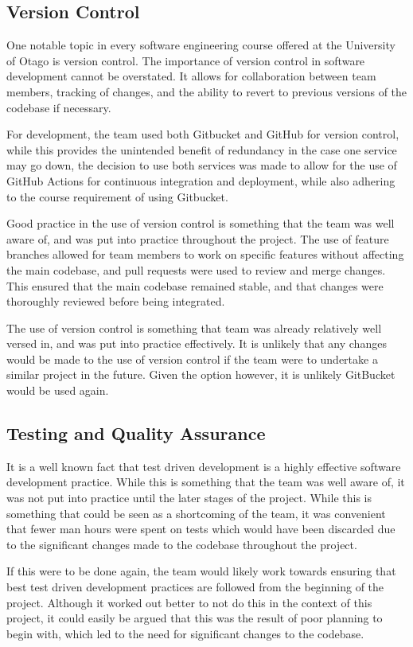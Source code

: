 \documentclass[conference]{IEEEtran}
\begin{document}
\subsection{Version Control}
One notable topic in every software engineering course offered at the University of Otago is version control. The importance of version control in software development cannot be overstated. It allows for collaboration between team members, tracking of changes, and the ability to revert to previous versions of the codebase if necessary.

For development, the team used both Gitbucket and GitHub for version control, while this provides the unintended benefit of redundancy in the case one service may go down, the decision to use both services was made to allow for the use of GitHub Actions for continuous integration and deployment, while also adhering to the course requirement of using Gitbucket.

Good practice in the use of version control is something that the team was well aware of, and was put into practice throughout the project. The use of feature branches allowed for team members to work on specific features without affecting the main codebase, and pull requests were used to review and merge changes. This ensured that the main codebase remained stable, and that changes were thoroughly reviewed before being integrated.

The use of version control is something that team was already relatively well versed in, and was put into practice effectively. It is unlikely that any changes would be made to the use of version control if the team were to undertake a similar project in the future. Given the option however, it is unlikely GitBucket would be used again.

\subsection{Testing and Quality Assurance}
It is a well known fact that test driven development is a highly effective software development practice. While this is something that the team was well aware of, it was not put into practice until the later stages of the project. While this is something that could be seen as a shortcoming of the team, it was convenient that fewer man hours were spent on tests which would have been discarded due to the significant changes made to the codebase throughout the project. 

If this were to be done again, the team would likely work towards ensuring that best test driven development practices are followed from the beginning of the project. Although it worked out better to not do this in the context of this project, it could easily be argued that this was the result of poor planning to begin with, which led to the need for significant changes to the codebase.
\end{document}
